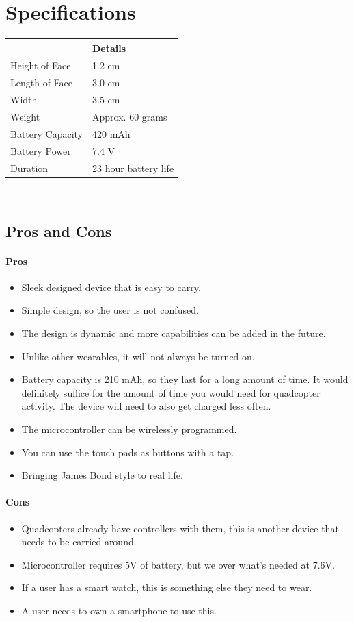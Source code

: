 \documentclass[12pt,letterpaper]{article}
\begin{document}
\section*{Specifications}
\begin{tabular}{| l | l |}
	 \hline
	 & Details \\ \hline
	Height of Face & 1.2 cm \\ %
	Length of Face & 3.0 cm \\ %
	Width &  3.5 cm \\ %
	Weight &  Approx. 60 grams \\ %
	Battery Capacity & 420 mAh \\ %
	Battery Power & 7.4 V \\ %
	Duration & 23 hour battery life \\ \hline
\end{tabular} \\

\subsection*{Pros and Cons}
\paragraph{Pros}
\begin{itemize}
	\item Sleek designed device that is easy to carry.
	\item Simple design, so the user is not confused.
	\item The design is dynamic and more capabilities can be added in the future.
	\item Unlike other wearables, it will not always be turned on.
	\item Battery capacity is 210 mAh, so they last for a long amount of time. It would definitely suffice for the amount of time you would need for quadcopter activity. The device will need to also get charged less often.
	\item The microcontroller can be wirelessly programmed.
	\item You can use the touch pads as buttons with a tap.	
	\item Bringing James Bond style to real life.
\end{itemize}

\paragraph{Cons}
\begin{itemize}
	\item Quadcopters already have controllers with them, this is another device that needs to be carried around.
	\item Microcontroller requires 5V of battery, but we over what's needed at 7.6V.
	\item If a user has a smart watch,  this is something else they need to wear.
	\item A user needs to own a smartphone to use this.
\end{itemize}
\end{document}
